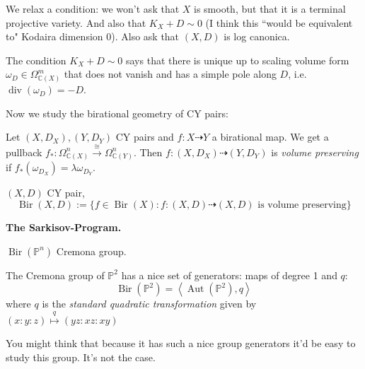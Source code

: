 \begin{definition}%
[Calabi-Yau pair]\leavevmode
We relax a condition: we won't ask that $X$
is smooth, but that it is a terminal
projective variety. And also that $K_X+D
\sim 0$ (I think this ``would be equivalent
to" Kodaira dimension 0). Also ask that
$(X,D)$ is log canonica.
\end{definition}

\begin{remark}\leavevmode
The condition $K_X+D \sim 0$ says that
there is unique up to scaling volume form
$\omega_D \in \Omega^m_{\mathbb{C}(X)}$
that does not vanish and has a simple pole
along $D$, i.e.
$\operatorname{div}(\omega_D)=-D$.
\end{remark}

Now we study the birational geometry of CY
pairs:

\begin{definition}\leavevmode
Let $(X,D_X),(Y,D_Y)$ CY pairs and $f: X
\dashrightarrow Y$ a birational map. We get
a pullback
$f_*:\Omega^n_{\mathbb{C}(X)}
\overset{\cong}{\to}
\Omega^n_{\mathbb{C}(Y)}$. Then $f:(X,D_X)
\dashrightarrow (Y,D_Y)$ is
{\it volume preserving} if
$f_*(\omega_{D_X})=\lambda \omega_{D_Y}$.
\end{definition}

\begin{remark}\leavevmode

\end{remark}

\begin{definition}\leavevmode
$(X,D)$ CY pair,
$$\operatorname{Bir}(X,D):=\{f \in
\operatorname{Bir}(X) : f:(X,D)
\dashrightarrow (X,D) \text{ is volume
preserving} \}$$
\end{definition}

\medskip\noindent
\textbf{The Sarkisov-Program.}

$\operatorname{Bir}(\mathbb{P}^n)$ Cremona
group.

\begin{theorem}\leavevmode
The Cremona group of $\mathbb{P}^2$ has a
nice set of generators: maps of degree 1 and
$q$:
$$\operatorname{Bir}(\mathbb{P}^2) =
\left\langle{}\operatorname{Aut}(\mathbb{P}^2),
q\right\rangle{}$$
where $q$ is the {\it standard
quadratic transformation} given by $(x:y:z)
\overset{q}{\mapsto }(yz:xz:xy)$
\end{theorem}

You might think that because it has such a
nice group generators it'd be easy to study
this group. It's not the case.

